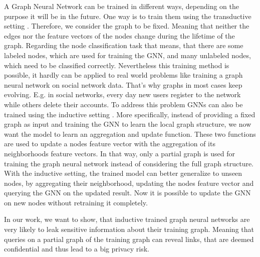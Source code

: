 		A Graph Neural Network can be trained in different ways, depending on the purpose it will be in the future.
		One way is to train them using the transductive setting \cite{5206871, ZHA2010187, WANG2017218, 10.1007/978-3-642-04174-7_29}.
		Therefore, we consider the graph to be fixed.
		Meaning that neither the edges nor the feature vectors of the nodes change during the lifetime of the graph.
		Regarding the node classification task that means, that there are some labeled nodes, which are used for training the GNN, and many unlabeled nodes, which need to be classified correctly.
		Nevertheless this training method is possible, it hardly can be applied to real world problems like training a graph neural network on social network data.
		That's why graphs in most cases keep evolving.
		E.g. in social networks, every day new users register to the network while others delete their accounts.
		To address this problem GNNs can also be trained using the inductive setting \cite{zeng2020graphsaint, 8519335, zhang2020document}.
		More specifically, instead of providing a fixed graph as input and training the GNN to learn the local graph structure, we now want the model to learn an aggregation and update function.
		These two functions are used to update a nodes feature vector with the aggregation of its neighborhoods feature vectors.
		In that way, only a partial graph is used for training the graph neural network instead of considering the full graph structure.
		With the inductive setting, the trained model can better generalize to unseen nodes, by aggregating their neighborhood, updating the nodes feature vector and querying the GNN on the updated result.
		Now it is possible to update the GNN on new nodes without retraining it completely.

		In our work, we want to show, that inductive trained graph neural networks are very likely to leak sensitive information about their training graph. 
		Meaning that queries on a partial graph of the training graph can reveal links, that are deemed confidential and thus lead to a big privacy risk.

